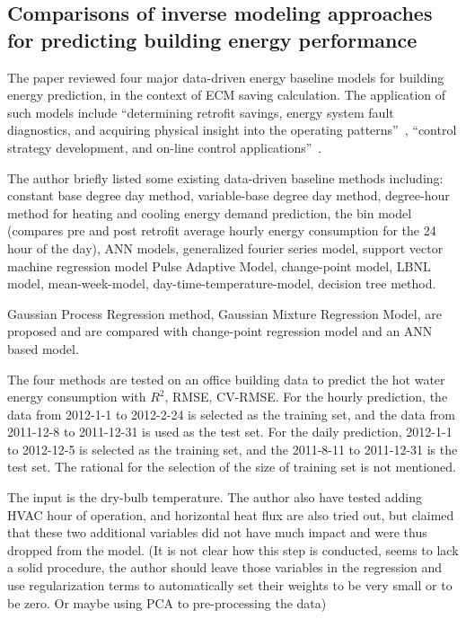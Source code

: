 \documentclass[12pt]{article}
\begin{document}
\subsection{Comparisons of inverse modeling approaches for predicting
  building energy performance~\cite{Zhang2015177}}
The paper reviewed four major data-driven energy baseline models for
building energy prediction, in the context of ECM saving calculation.
The application of such models include ``determining retrofit savings,
energy system fault diagnostics, and acquiring physical insight into
the operating patterns''~\cite{Zhang2015177}, ``control strategy
development, and on-line control applications''~\cite{Zhang2015177}.

The author briefly listed some existing data-driven baseline methods
including: constant base degree day method, variable-base degree day
method, degree-hour method for heating and cooling energy demand
prediction, the bin model (compares pre and post retrofit average
hourly energy consumption for the 24 hour of the day), ANN models,
generalized fourier series model, support vector machine regression
model Pulse Adaptive Model, change-point model, LBNL model,
mean-week-model, day-time-temperature-model, decision tree method.

Gaussian Process Regression method, Gaussian Mixture Regression Model,
are proposed and are compared with change-point regression model and
an ANN based model.

The four methods are tested on an office building data to predict the
hot water energy consumption with $R^2$, RMSE, CV-RMSE. For the hourly
prediction, the data from 2012-1-1 to 2012-2-24 is selected as the
training set, and the data from 2011-12-8 to 2011-12-31 is used as the
test set. For the daily prediction, 2012-1-1 to 2012-12-5 is selected
as the training set, and the 2011-8-11 to 2011-12-31 is the test
set. The rational for the selection of the size of training set is not
mentioned.

The input is the dry-bulb temperature. The author also have tested
adding HVAC hour of operation, and horizontal heat flux are also tried
out, but claimed that these two additional variables did not have much
impact and were thus dropped from the model. (It is not clear how this
step is conducted, seems to lack a solid procedure, the author should
leave those variables in the regression and use regularization terms
to automatically set their weights to be very small or to be zero. Or
maybe using PCA to pre-processing the data)
\end{document}
